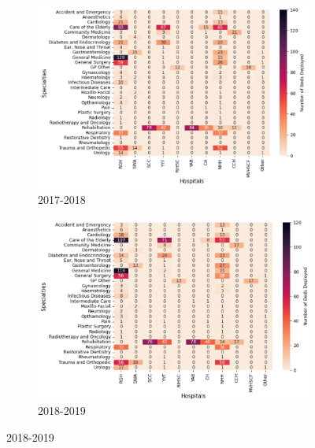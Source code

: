 \documentclass[../thesis.tex]{subfiles}
\begin{document}
\begin{figure}
     \centering
     \begin{subfigure}[h!]{0.8\textwidth}
         \centering
         \includegraphics[width=\textwidth]{Chapters/Chapter5/Figuresnew/18stoc.png}
         \caption{2017-2018}
         \label{fig:stocexp2a}
     \end{subfigure}
\hfill
     \begin{subfigure}[h!]{0.8\textwidth}\ContinuedFloat
         \centering
         \includegraphics[width=\textwidth]{Chapters/Chapter5/Figuresnew/19stoc.png}
         \caption{2018-2019}
         \label{fig:stocexp2b}
     \end{subfigure}
     \end{figure}
\hfill
\end{document}
